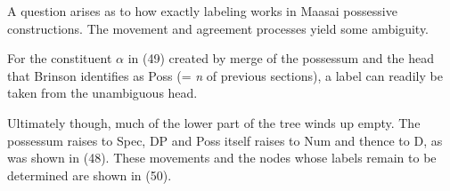 \documentclass[output=paper
,modfonts
,nonflat]{langsci/langscibook}
\begin{document}
A question arises as to how exactly labeling works in Maasai possessive constructions. The movement and agreement processes yield some ambiguity.

For the constituent $\alpha$ in (49) created by merge of the possessum and the head that Brinson identifies as Poss (= \textit{n} of previous sections), a label can readily be taken from the unambiguous head.  

\begin{figure}[!h]
	\begin{exe}
	\end{exe}
\end{figure}
\noindent Ultimately though, much of the lower part of the tree winds up empty. The possessum raises to Spec, DP and Poss itself raises to Num and thence to D, as was shown in (48). These movements and the nodes whose labels remain to be determined are shown in (50).
\end{document}
